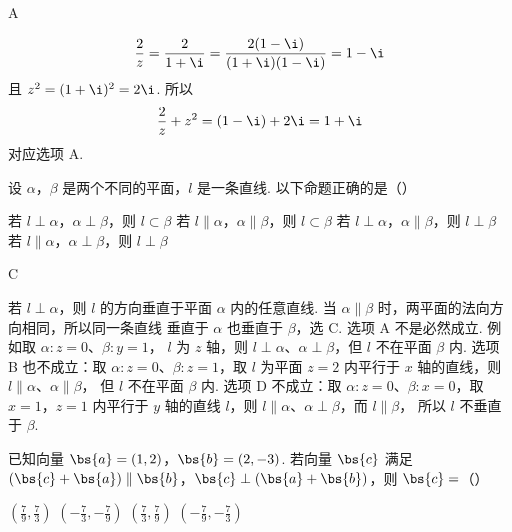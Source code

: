 \begin{answer}
A
\end{answer}

\begin{solution}
\[
\frac{2}{z}=\frac{2}{1+\i}=\frac{2(1-\i)}{(1+\i)(1-\i)}=1-\i
\]
且 \(z^2=(1+\i)^2=2\i\).
所以
\[
\frac{2}{z}+z^2=(1-\i)+2\i=1+\i
\]
对应选项 A.
\end{solution}

\begin{problem}
设 \(\alpha\)，\(\beta\) 是两个不同的平面，\(l\) 是一条直线. 以下命题正确的是（\quad）

\choices
    {若 \(l \perp \alpha\)，\(\alpha \perp \beta\)，则 \(l \subset \beta\)}
    {若 \(l \parallel \alpha\)，\(\alpha \parallel \beta\)，则 \(l \subset \beta\)}
    {若 \(l \perp \alpha\)，\(\alpha \parallel \beta\)，则 \(l \perp \beta\)}
    {若 \(l \parallel \alpha\)，\(\alpha \perp \beta\)，则 \(l \perp \beta\)}
\end{problem}

\begin{answer}
C
\end{answer}

\begin{solution}
若 \(l\perp\alpha\)，则 \(l\) 的方向垂直于平面 \(\alpha\) 内的任意直线.
当 \(\alpha\parallel\beta\) 时，两平面的法向方向相同，所以同一条直线
垂直于 \(\alpha\) 也垂直于 \(\beta\)，选 C.
选项 A 不是必然成立. 例如取 \(\alpha:z=0\)、\(\beta:y=1\)，
\(l\) 为 \(z\) 轴，则 \(l\perp\alpha\)、\(\alpha\perp\beta\)，但
\(l\) 不在平面 \(\beta\) 内. 选项 B 也不成立：取
\(\alpha:z=0\)、\(\beta:z=1\)，取 \(l\) 为平面 \(z=2\) 内平行于
\(x\) 轴的直线，则 \(l\parallel\alpha\)、\(\alpha\parallel\beta\)，
但 \(l\) 不在平面 \(\beta\) 内. 选项 D 不成立：取
\(\alpha:z=0\)、\(\beta:x=0\)，取 \(x=1\)，\(z=1\) 内平行于 \(y\) 轴的直线
\(l\)，则 \(l\parallel\alpha\)、\(\alpha\perp\beta\)，而 \(l\parallel\beta\)，
所以 \(l\) 不垂直于 \(\beta\).
\end{solution}

\begin{problem}
已知向量 \(\bs{a} = (1, 2)\)，\(\bs{b} = (2, -3)\). 若向量 \(\bs{c}\) 满足 \((\bs{c} + \bs{a}) \parallel \bs{b}\)，\(\bs{c} \perp (\bs{a} + \bs{b})\)，则 \(\bs{c} =\)（\quad）

\choices
    {\(\left(\frac{7}{9}, \frac{7}{3}\right)\)}
    {\(\left(-\frac{7}{3}, -\frac{7}{9}\right)\)}
    {\(\left(\frac{7}{3}, \frac{7}{9}\right)\)}
    {\(\left(-\frac{7}{9}, -\frac{7}{3}\right)\)}
\end{problem}

